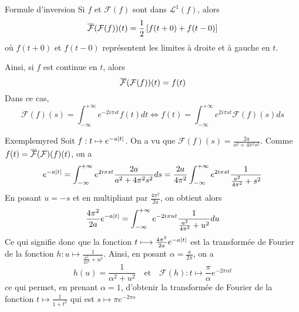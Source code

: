     \begin{theo}{Formule d’inversion}{}
        Si $f$ et $\mathcal{F}(f)$ sont dans $\mathcal{L}^1(f)$, alors 
        \[ \overline{\mathcal{F}}(\mathcal{F}(f))(t) = \frac{1}{2} \left[f(t+0) + f(t-0)\right] \] 
        où $f(t+0)$ et $f(t-0)$ représentent les limites à droite et à gauche en $t$.

        Ainsi, si $f$ est continue en $t$, alors 
        \[ \overline{\mathcal{F}}(\mathcal{F}(f))(t) = f(t) \] 
        Dans ce cas,
        \[ \mathcal{F}(f)(s) = \int_{-\infty}^{+\infty} e^{-2i\pi st}f(t)dt \iff f(t) = \int_{-\infty}^{+\infty} e^{2i\pi st} \mathcal{F}(f)(s)ds \]
    \end{theo}

    \begin{omed}{Exemple}{myred}
        Soit $f : t \mapsto e^{-a\left\lvert t\right\rvert}$. On a vu que $\mathcal{F}(f)(s) = \frac{2a}{a^2 + 4 \pi^2 s^2}$. Comme $f(t) = \overline{\mathcal{F}}(\mathcal{F})(f)(t)$, on a 
        \[ e^{-a\left\lvert t\right\rvert} = \int_{-\infty}^{+\infty} e^{2i \pi st} \frac{2a}{a^2 + 4 \pi^2 s^2} ds = \frac{2a}{4 \pi^2} \int_{-\infty}^{+\infty} e^{2i \pi s t} \frac{1}{\frac{a^2}{4\pi^2} + s^2} \] 
        En posant $u = -s$ et en multipliant par $\frac{4 \pi^2}{2a}$, on obtient alors 
        \[ \frac{4 \pi^2}{2a} e^{-a \left\lvert t\right\rvert} = \int_{-\infty}^{+\infty} e^{-2 i \pi u t} \frac{1}{\frac{a^2}{4\pi^2} + u^2} du \] 
        Ce qui signifie donc que la fonction $t \longmapsto \frac{4 \pi^2}{2a} e^{-a \left\lvert t\right\rvert}$ est la transformée de Fourier de la fonction $h : u \mapsto \frac{1}{\frac{a^2}{4\pi^2} + u^2}$. Ainsi, en posant $\alpha = \frac{a}{2\pi}$, on a 
        \[ h(u) = \frac{1}{\alpha^2 + u^2} \quad \text{et} \quad \mathcal{F}(h) : t \mapsto \frac{\pi}{\alpha} e^{-2 \pi \alpha t} \] 
        ce qui permet, en prenant $\alpha = 1$, d’obtenir la transformée de Fourier de la fonction $t \longmapsto \frac{1}{1+t^2}$ qui est $s \longmapsto \pi e^{-2 \pi s}$
    \end{omed}


    




    